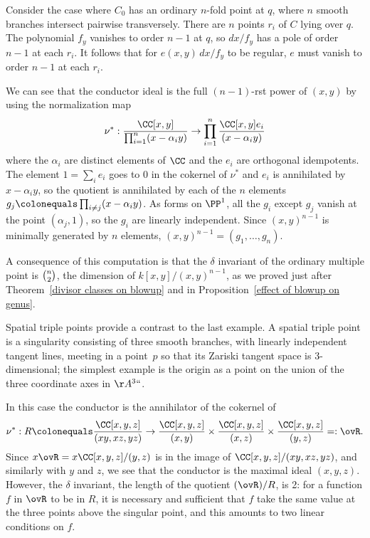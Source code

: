 \begin{example}
\label{ord n-fold}
Consider the case where $C_{0}$ has an ordinary $n$-fold point at  $q$,
where
$n$
smooth branches intersect pairwise transversely.
There are
$n$ points
%
$r_i$ of $C$ lying over $q$. The polynomial $f_y$ vanishes to order $n-1$
at $q$, so $dx/f_y$ has a pole of order $n-1$ at
each $r_i$. It follows that for $e(x,y)\,dx/f_y$ to be regular, $e$ must
vanish to order $n-1$ at each $r_i$.

We can see that the conductor ideal is the full $(n-1)$-rst power of
$(x,y)$ by using the
normalization map
$$
\nu^{*}: \frac{\CC[x,y]}{\prod_{i=1}^{n} (x-\alpha_{i}y)} \to
 \prod_{i=1}^{n} \frac{\CC[x,y]e_{i}}{(x-\alpha_{i}y)}
$$
where the $\alpha_{i}$ are distinct elements of $\CC$ and the $e_{i}$
are orthogonal idempotents.
The element $1 = \sum_{i}e_{i}$ goes to 0 in the cokernel of $\nu^{*}$
and $e_{i}$
is annihilated by $x-\alpha_{i}y$,
so the quotient is annihilated by each of the $n$ elements $g_{j}
\colonequals  \prod_{i\neq j} (x-\alpha_{i}y)$.
As forms on $\PP^{1}$, all the $g_{i}$ except $g_{j}$ vanish at the
point $(\alpha_{j}, 1)$, so the $g_{i}$ are linearly independent. Since
$(x,y)^{n-1}$ is minimally generated by $n$ elements, $(x,y)^{n-1} =
(g_{1}, \dots, g_{n})$.

A consequence of this computation is that the $\delta$ invariant of the
%
ordinary multiple point is $\tbinom{n}{2}$, the dimension of
%
$k[x,y]/(x,y)^{n-1}$, as we proved just after
Theorem~\ref{divisor classes on blowup} and in 
Proposition~\ref{effect of blowup on genus}.
\end{example}

\begin{example}\label{spatial triple points}
Spatial triple points provide a contrast to the last example. A
spatial triple point is a singularity consisting of three smooth
branches, with linearly independent tangent lines, meeting 
in a point~$p$ so that its Zariski tangent space is 3-dimensional; the simplest
%
example is the origin as a point on the union of the three coordinate
axes in $\AA^3` `$.

In this case the conductor is the annihilator of the cokernel of
\vspace{3pt}
$$
\nu^{*}: R \colonequals  \frac{\CC[x,y,z]}{(xy, xz, yz)} \to
\frac{\CC[x,y,z]}{(x,y)} \times \frac{\CC[x,y,z]}{(x,z)} \times
\frac{\CC[x,y,z]}{(y,z)} =: \ovR.
$$
Since $x\ovR = x \CC[x,y,z]/(y,z)$ is in the image of
$\CC[x,y,z]/(xy, xz, yz)$, and similarly with $y$ and $z$,
we see that the conductor is the maximal ideal $(x,y,z)$. However,
the $\delta$ invariant, the length
%
of the quotient $(\ovR)/R$, is 2: for a function $f$ in $\ovR$ to be in $R$, it
is necessary and sufficient that $f$ take the same value at the three
points above the singular point,
and this 
amounts to two
linear conditions on $f$.
\end{example}

